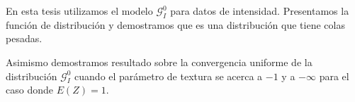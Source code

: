 En esta tesis utilizamos el modelo $\mathcal{G}_I^0$ para datos de intensidad. Presentamos la función de distribución y demostramos que es una distribución que tiene colas pesadas.

Asimismo demostramos resultado sobre la convergencia uniforme de la distribución $\mathcal{G}_I^0$ cuando el parámetro de textura se acerca a $-1$ y a $-\infty$ para el caso donde $E(Z)=1$.




